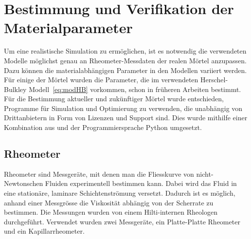 \section{Bestimmung und Verifikation der Materialparameter}
\label{Kapitel:Parameter}
Um eine realistische Simulation zu ermöglichen, ist es notwendig die verwendeten Mo\-delle möglichst genau an Rheometer-Messdaten der realen Mörtel anzupassen. Dazu können die materialabhängigen Parameter in den Modellen variiert werden.
Für einige der Mörtel wurden die Parameter, die im verwendeten Herschel-Bulkley Modell~\eqref{eq:modHB} vorkommen, schon in früheren Arbeiten bestimmt.
Für die Bestimmung aktueller und zukünftiger Mörtel  wurde entschieden, Programme für Simulation und Optimierung zu verwenden, die unabhängig von Drittanbietern in Form von Lizenzen und Support sind.
Dies wurde mithilfe einer Kombination aus \openfoam{} und der Programmiersprache Python umgesetzt.
%
\subsection{Rheometer}
\label{Kapitel:Rheometer}
Rheometer sind Messgeräte, mit denen man die Fliesskurve von nicht-Newtonschen Fluiden experimentell bestimmen kann.
Dabei wird das Fluid in eine stationäre, laminare Schichtenströmung versetzt. Dadurch ist es möglich, anhand einer
Messgrösse die Viskosität abhängig von der Scherrate zu bestimmen.
Die Messungen wurden von einem Hilti-internen Rheo\-logen durchgeführt. Verwendet wurden zwei Messgeräte, ein Platte-Platte Rheometer und ein Kapillarrheometer.
%
